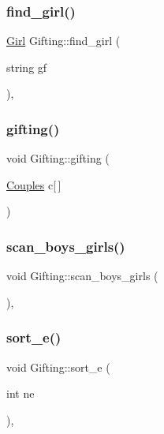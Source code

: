 \subsubsection{\texorpdfstring{find\+\_\+girl()}{find\_girl()}}
{\footnotesize\ttfamily \hyperlink{classGirl}{Girl} Gifting\+::find\+\_\+girl (\begin{DoxyParamCaption}\item[{string}]{gf }\end{DoxyParamCaption})\hspace{0.3cm}{\ttfamily [inline]}, {\ttfamily [private]}}

\mbox{\label{classGifting_a1eb3c06f799c98f1d3fdfffb5bd69681}} 
\subsubsection{\texorpdfstring{gifting()}{gifting()}}
{\footnotesize\ttfamily void Gifting\+::gifting (\begin{DoxyParamCaption}\item[{\hyperlink{classCouples}{Couples}}]{c\mbox{[}$\,$\mbox{]} }\end{DoxyParamCaption})\hspace{0.3cm}{\ttfamily [inline]}}

\mbox{\label{classGifting_ae076b4496936b1f6d8564f32a3630ed3}} 
\subsubsection{\texorpdfstring{scan\+\_\+boys\+\_\+girls()}{scan\_boys\_girls()}}
{\footnotesize\ttfamily void Gifting\+::scan\+\_\+boys\+\_\+girls (\begin{DoxyParamCaption}{ }\end{DoxyParamCaption})\hspace{0.3cm}{\ttfamily [inline]}, {\ttfamily [private]}}

\mbox{\label{classGifting_a3e6a338a3bc0e9f57e8bdba2f84e040b}} 
\subsubsection{\texorpdfstring{sort\+\_\+e()}{sort\_e()}}
{\footnotesize\ttfamily void Gifting\+::sort\+\_\+e (\begin{DoxyParamCaption}\item[{int}]{ne }\end{DoxyParamCaption})\hspace{0.3cm}{\ttfamily [inline]}, {\ttfamily [private]}}

